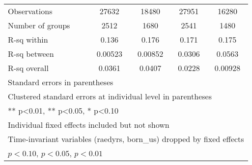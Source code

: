 \begin{table}[htbp]
\begin{tabular}{l*{4}{c}}
Observations    &    27632         &    18480         &    27951         &    16280         \\
Number of groups&     2512         &     1680         &     2541         &     1480         \\
R-sq within     &    0.136         &    0.176         &    0.171         &    0.175         \\
R-sq between    &  0.00523         &  0.00852         &   0.0306         &   0.0563         \\
R-sq overall    &   0.0361         &   0.0407         &   0.0228         &  0.00928         \\
\bottomrule
\multicolumn{5}{l}{\footnotesize Standard errors in parentheses}\\
\multicolumn{5}{l}{\footnotesize Clustered standard errors at individual level in parentheses}\\
\multicolumn{5}{l}{\footnotesize *** p<0.01, ** p<0.05, * p<0.10}\\
\multicolumn{5}{l}{\footnotesize Individual fixed effects included but not shown}\\
\multicolumn{5}{l}{\footnotesize Time-invariant variables (raedyrs, born\_us) dropped by fixed effects}\\
\multicolumn{5}{l}{\footnotesize \sym{*} \(p<0.10\), \sym{**} \(p<0.05\), \sym{***} \(p<0.01\)}\\
\end{tabular}
\end{table}
